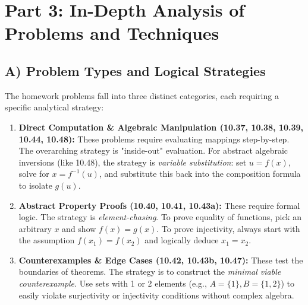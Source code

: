 \documentclass[11pt, a4paper]{article}
\theoremstyle{definition}
\theoremstyle{remark}
\begin{document}
\section{Part 3: In-Depth Analysis of Problems and Techniques}

\subsection{A) Problem Types and Logical Strategies}
The homework problems fall into three distinct categories, each requiring a specific analytical strategy:
\begin{enumerate}
    \item \textbf{Direct Computation \& Algebraic Manipulation (10.37, 10.38, 10.39, 10.44, 10.48):} These problems require evaluating mappings step-by-step. The overarching strategy is "inside-out" evaluation. For abstract algebraic inversions (like 10.48), the strategy is \textit{variable substitution}: set $u = f(x)$, solve for $x = f^{-1}(u)$, and substitute this back into the composition formula to isolate $g(u)$.
    \item \textbf{Abstract Property Proofs (10.40, 10.41, 10.43a):} These require formal logic. The strategy is \textit{element-chasing}. To prove equality of functions, pick an arbitrary $x$ and show $f(x) = g(x)$. To prove injectivity, always start with the assumption $f(x_1) = f(x_2)$ and logically deduce $x_1 = x_2$.
    \item \textbf{Counterexamples \& Edge Cases (10.42, 10.43b, 10.47):} These test the boundaries of theorems. The strategy is to construct the \textit{minimal viable counterexample}. Use sets with 1 or 2 elements (e.g., $A=\{1\}, B=\{1,2\}$) to easily violate surjectivity or injectivity conditions without complex algebra.
\end{enumerate}
\end{document}
